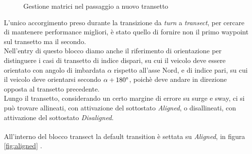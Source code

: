 \documentclass{article}
\begin{document}
            \begin{figure} [ht]
                \caption{Gestione matrici nel passaggio a nuovo transetto}
                \label{fig:pages}
            \end{figure}
                
            L'unico accorgimento preso durante la transizione da \emph{turn} a \emph{transect},
            per cercare di mantenere performance migliori, è stato quello di fornire non il primo waypoint sul transetto ma il secondo.\\
            Nell'entry di questo blocco diamo anche il riferimento di orientazione per distinguere i casi di transetto di indice dispari, 
            su cui il veicolo deve essere orientato con angolo di imbardata $\alpha$ rispetto all'asse Nord, e di indice pari, su cui il veicolo deve orientarsi secondo
            $ \alpha + 180\degree $, poichè deve andare in direzione opposta al transetto precedente.\\
            Lungo il transetto, considerando un certo margine di errore su surge e sway, ci si può trovare allineati, con attivazione del sottostato \emph{Aligned}, 
            o disallineati, con attivazione del sottostato \emph{Disaligned}.
            \\
            \\
            All'interno del blocco transect la default transition è settata su \emph{Aligned}, in figura \ref{fig:aligned} .
\end{document}
